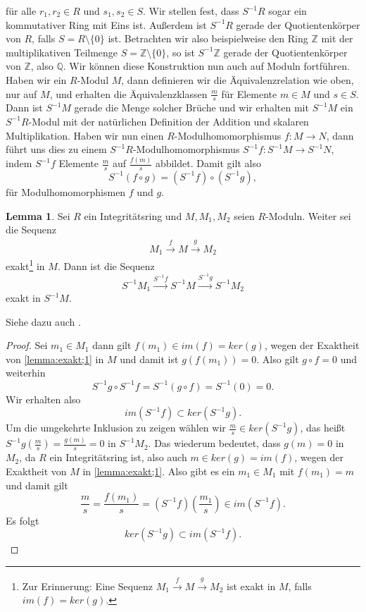 \documentclass[11pt,titlepage]{article}
\newcommand{\setZ}{\mathbb{Z}}
\newcommand{\setQ}{\mathbb{Q}}
\theoremstyle{definition}
\newtheorem{lemma}[theorem]{Lemma}
\theoremstyle{remark}
\begin{document}
	für alle $r_1,r_2\in R$ und $s_1,s_2\in S$. Wir stellen fest, dass 
	$S^{-1}R$ sogar ein kommutativer Ring mit Eins ist. Außerdem ist 
	$S^{-1}R$ gerade der Quotientenkörper von $R$, falls $S=R\setminus\{0\}$ ist. Betrachten wir also beispielweise den Ring 
	$\setZ$ mit der multiplikativen Teilmenge $S=\setZ\setminus\{0\}$, so 
	ist $S^{-1}\setZ$ gerade der Quotientenkörper von $\setZ$, also 
	$\setQ$. Wir können diese Konstruktion nun auch auf Moduln fortführen. 
	Haben wir ein $R$-Modul $M$, dann definieren wir 
	die Äquivalenzrelation wie oben, nur auf $M$, und erhalten die 
	Äquivalenzklassen $\frac{m}{s}$ für Elemente $m\in M$ und $s\in S$. 
	Dann ist $S^{-1}M$ gerade die Menge solcher Brüche und wir erhalten 
	mit $S^{-1}M$ ein $S^{-1}R$-Modul mit der natürlichen Definition 
	der Addition und skalaren Multiplikation. Haben wir nun einen 
	$R$-Modulhomomorphismus $f:M\to N$, dann führt uns dies zu einem 
	$S^{-1}R$-Modulhomomorphismus $S^{-1}f:S^{-1}M\to S^{-1}N$, indem $S^{-1}f$ 
	Elemente $\frac{m}{s}$ auf $\frac{f(m)}{s}$ abbildet. Damit gilt also 
	\[S^{-1}(f\circ g)=(S^{-1}f)\circ(S^{-1}g),\]
	für Modulhomomorphismen $f$ und $g$.
	
	\begin{lemma} \label{lemma:Buch;exakt}
		Sei $R$ ein Integritätsring und $M,M_1,M_2$ seien $R$-Moduln. Weiter 
		sei die Sequenz
		\begin{align}
			M_1\xrightarrow{f}M\xrightarrow{g}M_2 \label{lemma:exakt;1}
		\end{align}
		exakt\footnote{Zur Erinnerung: Eine Sequenz $M_1\xrightarrow{f}M\xrightarrow{g}M_2$ ist exakt in $M$, falls 
			$im(f)=ker(g)$.} in $M$. Dann ist die Sequenz
		\[S^{-1}M_1 \xrightarrow{S^{-1}f}S^{-1}M\xrightarrow{S^{-1}g}S^{-1}M_2\]
		exakt in $S^{-1}M$.
	\end{lemma}
	
	Siehe dazu auch \cite[Proposition 3.3]{introductiontocomalg}.
	
	\begin{proof}
		Sei $m_1\in M_1$ dann gilt $f(m_1)\in im(f)=ker(g)$, wegen der Exaktheit 
		von \ref{lemma:exakt;1} in $M$ und damit ist $g(f(m_1))=0$. Also gilt 
		$g\circ f=0$ und weiterhin
		\[S^{-1}g \circ S^{-1}f = S^{-1}(g\circ f)=S^{-1}(0)=0.\]
		Wir erhalten also
		\[im(S^{-1}f)\subset ker(S^{-1}g).\]
		Um die umgekehrte Inklusion zu zeigen wählen wir 
		$\frac{m}{s}\in ker(S^{-1}g)$, das heißt $S^{-1}g\left(\frac{m}{s}\right)=\frac{g(m)}{s}=0$ in $S^{-1}M_2$. 
		Das wiederum bedeutet, dass $g(m)=0$ in $M_2$, da $R$ ein Integritätsring 
		ist, also auch $m\in ker(g)=im(f)$, wegen der Exaktheit von $M$ in 
		\ref{lemma:exakt;1}. Also gibt es ein $m_1\in M_1$ mit $f(m_1)=m$ und damit 
		gilt
		\[\frac{m}{s}=\frac{f(m_1)}{s}=(S^{-1}f)\left(\frac{m_1}{s}\right)\in im(S^{-1}f).\]
		Es folgt 
		\[ker(S^{-1}g)\subset im(S^{-1}f).\]
	\end{proof}
\end{document}
